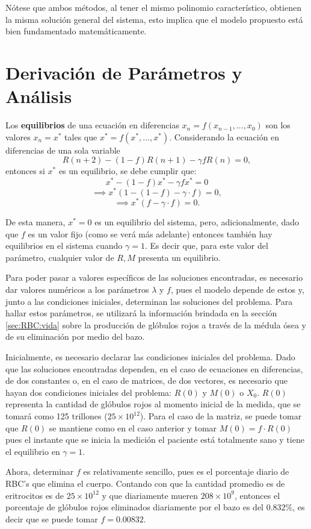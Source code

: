 Nótese que ambos métodos, al tener el mismo polinomio característico, obtienen la misma solución general del sistema, esto implica que el modelo propuesto está bien fundamentado matemáticamente.


\section{Derivación de Parámetros y Análisis}\label{sec:modelo:parametros}

Los \textbf{equilibrios} de una ecuación en diferencias $x_n=f(x_{n-1},...,x_0)$ son los valores $x_n=x^*$ tales que $x^*=f(x^*,...,x^*)$. Considerando la ecuación en diferencias de una sola variable 
$$R(n+2)-(1-f)R(n+1)-\gamma f R(n)=0,$$
entonces si $x^*$ es un equilibrio, se debe cumplir que:
$$x^*-(1-f)x^*-\gamma f x^*=0$$
$$\implies x^*(1-(1-f)-\gamma\cdot f)=0,$$
$$\implies x^*(f-\gamma\cdot f)=0.$$

De esta manera, $x^*=0$ es un equilibrio del sistema, pero, adicionalmente, dado que $f$ es un valor fijo (como se verá más adelante) entonces también hay equilibrios en el sistema cuando $\gamma = 1$. Es decir que, para este valor del parámetro, cualquier valor de $R,M$ presenta un equilibrio. 

Para poder pasar a valores específicos de las soluciones encontradas, es necesario dar valores numéricos a los parámetros $\lambda$ y $f$, pues el modelo depende de estos y, junto a las condiciones iniciales, determinan las soluciones del problema. Para hallar estos parámetros, se utilizará la información brindada en la sección \ref{sec:RBC:vida} sobre la producción de glóbulos rojos a través de la médula ósea y de su eliminación por medio del bazo.

Inicialmente, es necesario declarar las condiciones iniciales del problema. Dado que las soluciones encontradas dependen, en el caso de ecuaciones en diferencias, de dos constantes o, en el caso de matrices, de dos vectores, es necesario que hayan dos condiciones iniciales del problema: $R(0)$ y $M(0)$ o $X_0$. $R(0)$ representa la cantidad de glóbulos rojos al momento inicial de la medida, que se tomará como 125 trillones ($25\times 10^{12}$). Para el caso de la matriz, se puede tomar que $R(0)$ se mantiene como en el caso anterior y tomar $M(0)=f\cdot R(0)$ pues el instante que se inicia la medición el paciente está totalmente sano y tiene el equilibrio en $\gamma = 1$. 

Ahora, determinar $f$ es relativamente sencillo, pues es el porcentaje diario de RBC's que elimina el cuerpo. Contando con que la cantidad promedio es de eritrocitos es de $25\times 10^{12}$ y que diariamente mueren $208\times 10^{9}$, entonces el porcentaje de glóbulos rojos eliminados diariamente por el bazo es del $0.832\%$, es decir que se puede tomar $f=0.00832$. 

